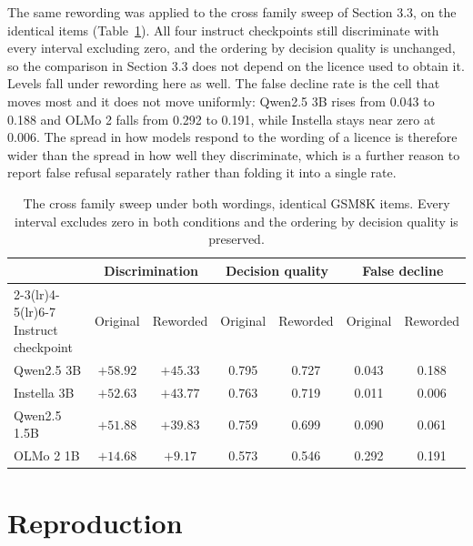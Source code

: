 \documentclass{article}
\begin{document}
The same rewording was applied to the cross family sweep of Section 3.3, on the identical
items (Table~\ref{tab:reword_fam}). All four instruct checkpoints still discriminate with
every interval excluding zero, and the ordering by decision quality is unchanged, so the
comparison in Section 3.3 does not depend on the licence used to obtain it. Levels fall
under rewording here as well. The false decline rate is the cell that moves most and it does
not move uniformly: Qwen2.5 3B rises from 0.043 to 0.188 and OLMo 2 falls from 0.292 to
0.191, while Instella stays near zero at 0.006. The spread in how models respond to the
wording of a licence is therefore wider than the spread in how well they discriminate, which
is a further reason to report false refusal separately rather than folding it into a single
rate.

\begin{table}[h]
\centering
\caption{The cross family sweep under both wordings, identical GSM8K items. Every interval
excludes zero in both conditions and the ordering by decision quality is preserved.}
\label{tab:reword_fam}
\small
\begin{tabular}{lcccccc}
\toprule
& \multicolumn{2}{c}{Discrimination} & \multicolumn{2}{c}{Decision quality}
& \multicolumn{2}{c}{False decline} \\
\cmidrule(lr){2-3}\cmidrule(lr){4-5}\cmidrule(lr){6-7}
Instruct checkpoint & Original & Reworded & Original & Reworded & Original & Reworded \\
\midrule
Qwen2.5 3B    & $+58.92$ & $+45.33$ & 0.795 & 0.727 & 0.043 & 0.188 \\
Instella 3B   & $+52.63$ & $+43.77$ & 0.763 & 0.719 & 0.011 & 0.006 \\
Qwen2.5 1.5B  & $+51.88$ & $+39.83$ & 0.759 & 0.699 & 0.090 & 0.061 \\
OLMo 2 1B     & $+14.68$ & $+9.17$  & 0.573 & 0.546 & 0.292 & 0.191 \\
\bottomrule
\end{tabular}
\end{table}

\section{Reproduction}
\end{document}
